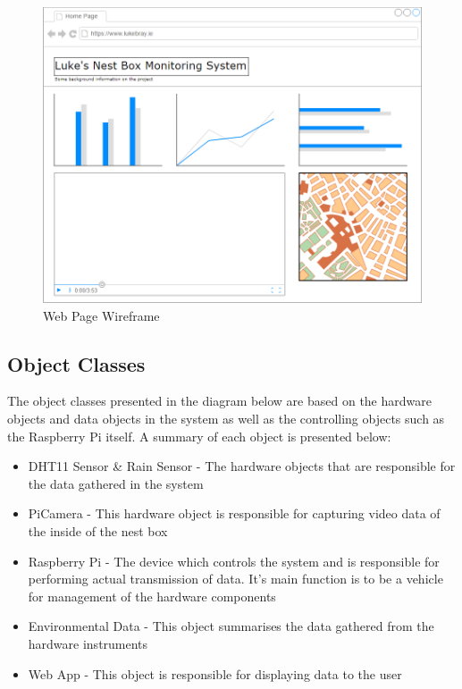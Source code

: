 \documentclass[10pt,a4paper]{article}
\begin{document}
\begin{figure}[H]
\centering
  \includegraphics[width=\linewidth]{images/web_page_mock_up.png}
  \caption{Web Page Wireframe}
  \label{fig:webwireframe}
\end{figure}

\subsection{Object Classes}
The object classes presented in the diagram below are based on the hardware objects and data objects in the system as well as the controlling objects such as the Raspberry Pi itself. A summary of each object is presented below:
\begin{itemize}
\item DHT11 Sensor \& Rain Sensor - The hardware objects that are responsible for the data gathered in the system
\item PiCamera - This hardware object is responsible for capturing video data of the inside of the nest box
\item Raspberry Pi - The device which controls the system and is responsible for performing actual transmission of data. It's main function is to be a vehicle for management of the hardware components
\item Environmental Data - This object summarises the data gathered from the hardware instruments
\item Web App - This object is responsible for displaying data to the user 
\end{itemize}
\end{document}

